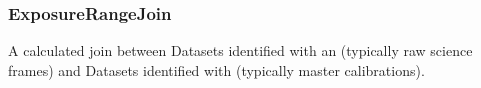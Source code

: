 \subsubsection{ExposureRangeJoin}
\label{join:ExposureRangeJoin}

A calculated join between Datasets identified with an
 (typically raw science frames) and Datasets
identified with  (typically master
calibrations).

